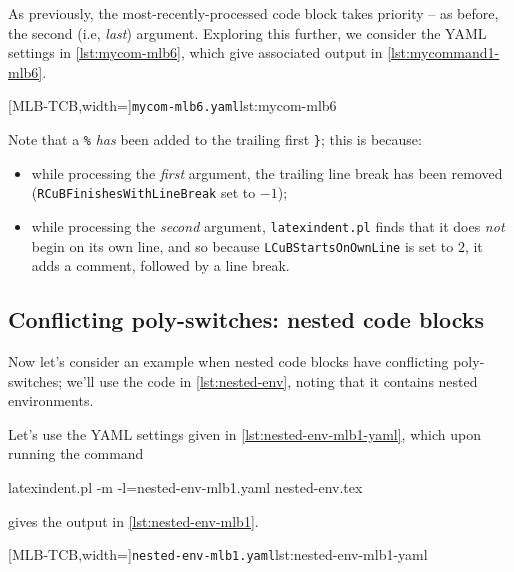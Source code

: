 	As previously, the most-recently-processed code block takes priority -- as before, the second (i.e, \emph{last}) argument. Exploring this
	further, we consider the YAML settings in \cref{lst:mycom-mlb6}, which give associated output in \cref{lst:mycommand1-mlb6}.

	\begin{minipage}{.4\linewidth}
	\end{minipage}
	\hfill
	\begin{minipage}{.55\linewidth}
		[MLB-TCB,width=\linewidth]{\texttt{mycom-mlb6.yaml}}{lst:mycom-mlb6}
	\end{minipage}

	Note that a \lstinline!%! \emph{has} been added to the trailing first \lstinline!}!; this is because:
	\begin{itemize}
		\item while processing the \emph{first} argument, the trailing line break has been removed (\texttt{RCuBFinishesWithLineBreak} set to $-1$);
		\item while processing the \emph{second} argument, \texttt{latexindent.pl} finds that it does \emph{not} begin on its own line, and so
		      because \texttt{LCuBStartsOnOwnLine} is set to $2$, it adds a comment, followed by a line break.
	\end{itemize}

\subsection{Conflicting poly-switches: nested code blocks}
	Now let's consider an example when nested code blocks have conflicting poly-switches; we'll use the code in \cref{lst:nested-env},
	noting that it contains nested environments.


	Let's use the YAML settings given in \cref{lst:nested-env-mlb1-yaml}, which upon running the command
	\begin{commandshell}
latexindent.pl -m -l=nested-env-mlb1.yaml nested-env.tex
        \end{commandshell}
	gives the output in \cref{lst:nested-env-mlb1}.

	\begin{minipage}{.45\linewidth}
	\end{minipage}
	\hfill
	\begin{minipage}{.55\linewidth}
		[MLB-TCB,width=\linewidth]{\texttt{nested-env-mlb1.yaml}}{lst:nested-env-mlb1-yaml}
	\end{minipage}

